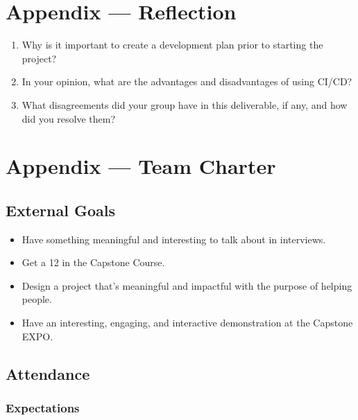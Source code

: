 \documentclass{article}
\begin{document}
\newpage{}

\section*{Appendix --- Reflection}




\begin{enumerate}
    \item Why is it important to create a development plan prior to starting the
    project?
    \item In your opinion, what are the advantages and disadvantages of using
    CI/CD?
    \item What disagreements did your group have in this deliverable, if any,
    and how did you resolve them?
\end{enumerate}

\newpage{}

\section*{Appendix --- Team Charter}

\subsection*{External Goals}

\begin{itemize}
\item Have something meaningful and interesting to talk about in interviews.
\item Get a 12 in the Capstone Course.
\item Design a project that's meaningful and impactful with the purpose of helping people.
\item Have an interesting, engaging, and interactive demonstration at the Capstone EXPO.
\end{itemize}

\subsection*{Attendance}

\subsubsection*{Expectations}
\end{document}

